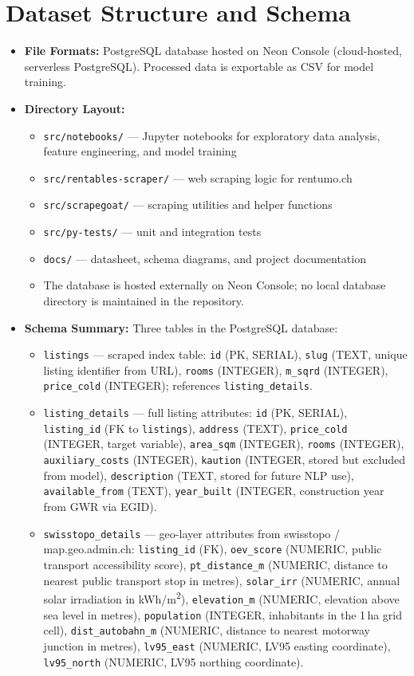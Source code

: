 \documentclass[11pt, a4paper]{article}
\begin{document}
\section{Dataset Structure and Schema}
\begin{itemize}
    \item \textbf{File Formats:} PostgreSQL database hosted on Neon Console (cloud-hosted, serverless PostgreSQL). Processed data is exportable as CSV for model training.
    \item \textbf{Directory Layout:}
    \begin{itemize}
        \item \texttt{src/notebooks/} --- Jupyter notebooks for exploratory data analysis, feature engineering, and model training
        \item \texttt{src/rentables-scraper/} --- web scraping logic for rentumo.ch
        \item \texttt{src/scrapegoat/} --- scraping utilities and helper functions
        \item \texttt{src/py-tests/} --- unit and integration tests
        \item \texttt{docs/} --- datasheet, schema diagrams, and project documentation
        \item The database is hosted externally on Neon Console; no local database directory is maintained in the repository.
    \end{itemize}
    \item \textbf{Schema Summary:} Three tables in the PostgreSQL database:
    \begin{itemize}
        \item \texttt{listings} --- scraped index table: \texttt{id} (PK, SERIAL), \texttt{slug} (TEXT, unique listing identifier from URL), \texttt{rooms} (INTEGER), \texttt{m\_sqrd} (INTEGER), \texttt{price\_cold} (INTEGER); references \texttt{listing\_details}.
        \item \texttt{listing\_details} --- full listing attributes: \texttt{id} (PK, SERIAL), \texttt{listing\_id} (FK to \texttt{listings}), \texttt{address} (TEXT), \texttt{price\_cold} (INTEGER, target variable), \texttt{area\_sqm} (INTEGER), \texttt{rooms} (INTEGER), \texttt{auxiliary\_costs} (INTEGER), \texttt{kaution} (INTEGER, stored but excluded from model), \texttt{description} (TEXT, stored for future NLP use), \texttt{available\_from} (TEXT), \texttt{year\_built} (INTEGER, construction year from GWR via EGID).
        \item \texttt{swisstopo\_details} --- geo-layer attributes from swisstopo / map.geo.admin.ch: \texttt{listing\_id} (FK), \texttt{oev\_score} (NUMERIC, public transport accessibility score), \texttt{pt\_distance\_m} (NUMERIC, distance to nearest public transport stop in metres), \texttt{solar\_irr} (NUMERIC, annual solar irradiation in kWh/m\textsuperscript{2}), \texttt{elevation\_m} (NUMERIC, elevation above sea level in metres), \texttt{population} (INTEGER, inhabitants in the 1\,ha grid cell), \texttt{dist\_autobahn\_m} (NUMERIC, distance to nearest motorway junction in metres), \texttt{lv95\_east} (NUMERIC, LV95 easting coordinate), \texttt{lv95\_north} (NUMERIC, LV95 northing coordinate).

\end{itemize}
\end{itemize}
\end{document}
